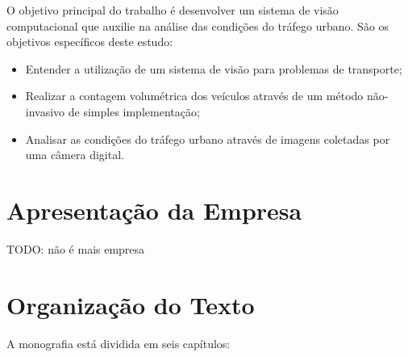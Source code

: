 O objetivo principal do trabalho é desenvolver um sistema de visão computacional que auxilie na análise das condições do tráfego urbano. São os objetivos específicos deste estudo:
\begin{itemize}
  \item Entender a utilização de um sistema de visão para problemas de transporte;
  \item Realizar a contagem volumétrica dos veículos através de um método não-invasivo de simples implementação;
  \item Analisar as condições do tráfego urbano através de imagens coletadas por uma câmera digital.
\end{itemize}


\section{Apresentação da Empresa} %
\label{sec:apresenta_o_da_empresa}

TODO: não é mais empresa




\section{Organização do Texto} %
\label{sec:organiza_o_do_texto}

A monografia está dividida em seis capítulos:

